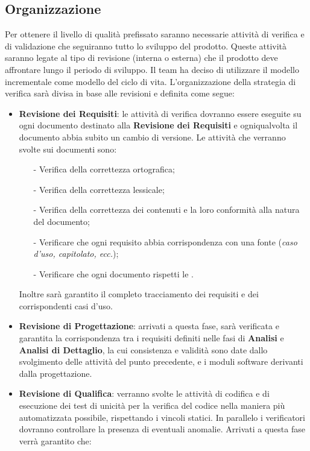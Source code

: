 \subsection{Organizzazione}
Per ottenere il livello di qualità prefissato saranno necessarie attività di verifica e di validazione che seguiranno tutto lo sviluppo del prodotto. Queste attività saranno legate al tipo di revisione (interna o esterna) che il prodotto deve affrontare lungo il periodo di sviluppo. Il team ha deciso di utilizzare il modello incrementale come modello del ciclo di vita. L’organizzazione della strategia di verifica sarà divisa in base alle revisioni e definita come segue:
\begin{itemize}
\item \textbf{Revisione dei Requisiti}: le attività di verifica dovranno essere eseguite su ogni documento destinato alla \textbf{Revisione dei Requisiti} e ogniqualvolta il documento abbia subito un cambio di versione. Le attività che verranno svolte sui documenti sono:
\begin{itemize}
\item[-] Verifica della correttezza ortografica;
\item[-] Verifica della correttezza lessicale;
\item[-] Verifica della correttezza dei contenuti e la loro conformità alla natura del documento;
\item[-] Verificare che ogni requisito abbia corrispondenza con una fonte (\textit{caso d’uso, capitolato, ecc.});
\item[-] Verificare che ogni documento rispetti le \textit{\NdP}.
\end{itemize}
Inoltre sarà garantito il completo tracciamento dei requisiti e dei corrispondenti casi d’uso.
\item \textbf{Revisione di Progettazione}: arrivati a questa fase, sarà verificata e garantita la corrispondenza tra i requisiti definiti nelle fasi di \textbf{Analisi} e \textbf{Analisi di Dettaglio}, la cui consistenza e validità sono date dallo svolgimento delle attività del punto precedente, e i moduli software derivanti dalla progettazione.
\item \textbf{Revisione di Qualifica}: verranno svolte le attività di codifica e di esecuzione dei test di unicità per la verifica del codice nella maniera più automatizzata possibile, rispettando i vincoli statici. In parallelo i verificatori dovranno controllare la presenza di eventuali anomalie. Arrivati a questa fase verrà garantito che:
\begin{itemize}

\end{itemize}
\end{itemize}
